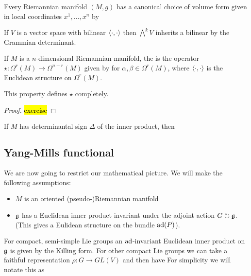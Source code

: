\documentclass{article}
\begin{document}
\begin{lemma}
	Every Riemannian manifold $(M,g)$ has a canonical choice of volume form given in local coordinates $x^1, \dots, x^n$ by 
\end{lemma}

\begin{lemma}
	If $V$ is a vector space with bilinear $\left\langle \cdot, \cdot \right\rangle$ then $\bigwedge^k V$ inherits a bilinear by the Grammian determinant. 
\end{lemma}

\begin{definition}
	If $M$ is a $n$-dimensional Riemannian manifold, the  is the operator $\star : \Omega^r(M) \to \Omega^{n-r}(M)$ given by 
for $\alpha,\beta \in \Omega^r(M)$, where $\left\langle \cdot,\cdot \right\rangle$ is the Euclidean structure on $\Omega^r(M)$. 
\end{definition}

\begin{lemma}
	This property defines $\star$ completely. 
\end{lemma}
\begin{proof}
	\hl{exercise}
	\end{proof}

\begin{prop}
	If $M$ has determinantal sign $\Delta$ of the inner product, then 
\end{prop}
\subsection{Yang-Mills functional}
We are now going to restrict our mathematical picture. We will make the following assumptions:
\begin{itemize}
	\item $M$ is an oriented (pseudo-)Riemannian manifold
	\item $\mathfrak{g}$ has a Euclidean inner product invariant under the adjoint action $G \circlearrowright \mathfrak{g}$. (This gives a Eulidean structure on the bundle $\operatorname{ad}(P)$). 
\end{itemize}

\begin{remark}
For compact, semi-simple Lie groups an $\operatorname{ad}$-invariant Euclidean inner product on $\mathfrak{g}$ is given by the Killing form. For other compact Lie groups we can take a faithful representation $\rho : G \to GL(V)$ and then have 
For simplicity we will notate this as 
\end{remark}
\end{document}

